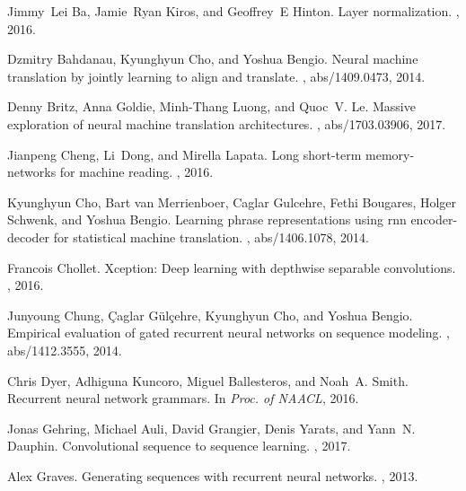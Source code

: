 \documentclass{article}
\begin{document}

%
\begin{thebibliography}{10}

Jimmy~Lei Ba, Jamie~Ryan Kiros, and Geoffrey~E Hinton.
\newblock Layer normalization.
, 2016.

Dzmitry Bahdanau, Kyunghyun Cho, and Yoshua Bengio.
\newblock Neural machine translation by jointly learning to align and
  translate.
, abs/1409.0473, 2014.

Denny Britz, Anna Goldie, Minh{-}Thang Luong, and Quoc~V. Le.
\newblock Massive exploration of neural machine translation architectures.
, abs/1703.03906, 2017.

Jianpeng Cheng, Li~Dong, and Mirella Lapata.
\newblock Long short-term memory-networks for machine reading.
, 2016.

Kyunghyun Cho, Bart van Merrienboer, Caglar Gulcehre, Fethi Bougares, Holger
  Schwenk, and Yoshua Bengio.
\newblock Learning phrase representations using rnn encoder-decoder for
  statistical machine translation.
, abs/1406.1078, 2014.

Francois Chollet.
\newblock Xception: Deep learning with depthwise separable convolutions.
, 2016.

Junyoung Chung, {\c{C}}aglar G{\"{u}}l{\c{c}}ehre, Kyunghyun Cho, and Yoshua
  Bengio.
\newblock Empirical evaluation of gated recurrent neural networks on sequence
  modeling.
, abs/1412.3555, 2014.

Chris Dyer, Adhiguna Kuncoro, Miguel Ballesteros, and Noah~A. Smith.
\newblock Recurrent neural network grammars.
\newblock In {\em Proc. of NAACL}, 2016.

Jonas Gehring, Michael Auli, David Grangier, Denis Yarats, and Yann~N. Dauphin.
\newblock Convolutional sequence to sequence learning.
, 2017.

Alex Graves.
\newblock Generating sequences with recurrent neural networks.
, 2013.


\end{thebibliography}
\end{document}
